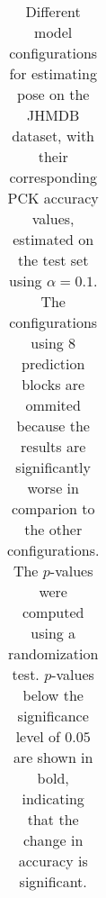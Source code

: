 \begin{table}[]
\begin{tabular}{|l|l|c|c|}
    \end{tabular}
    \caption{Different model configurations for estimating pose on the JHMDB dataset, with their corresponding PCK accuracy values, estimated on the test set using $\alpha = 0.1$. The configurations using $8$ prediction blocks are ommited because the results are significantly worse in comparion to the other configurations. The $p$-values were computed using a randomization test. $p$-values below the significance level of $0.05$ are shown in bold, indicating that the change in accuracy is significant.}
    \label{tab:jhmdb_results_confidence}
\end{table}

\begin{table}[]
    \small
    \centering
    \caption{Per joint accuracy, computed on the JHMDB test set using PCK @ 0.1 meassure. In addition, aggregated accuracy values are given in the third row for different sets of joints. \textit{Arms} for both left and right are computed by taking the average of the shoulder, elbow and wrist accuracies. \textit{Legs} are computed the same way, using knee, ankle and hip accuracy values. For \textit{Upper body}, upper neck and head top are added to both \textit{Arms} aggregations. \textit{Lower body} is computed by aggregating both \textit{legs} accuracies as well as pelvis.}
    \label{tab:jhmdb-perjoint}
\end{table}

